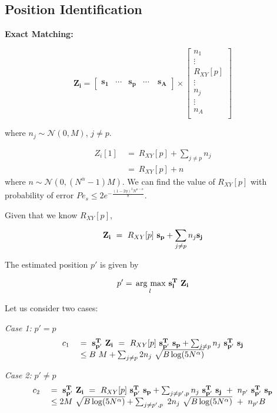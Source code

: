 \subsection{\bf Position Identification}
{\bf Exact Matching:}

\[
\mathbf{Z_i} = \begin{bmatrix}
\mathbf{s_1}       & \cdots   & \mathbf{s_p} &\cdots \ &\mathbf{s_A}
\end{bmatrix} \times
    \begin{bmatrix}
n_1 \\
\vdots \\
R_{XY}[p]\\
\vdots\\
n_j \\
\vdots\\
n_{A}\\
\end{bmatrix}
\]


where $n_j \sim \mathcal{N}(0,M)$, $j \neq p$.

\[\begin{array}{ll}
Z_i[1] \ &= \ R_{XY}[p] + \sum_{j \neq p}n_j \\
         &= \ R_{XY}[p] + n 
\end{array}
\]
where $n \sim \mathcal{N}(0,(N^\alpha-1)M)$. We can find the value of $R_{XY}[p]$ with probability of error $Pe_s \leq 2 e^{- \frac{(1-2\eta)^2N^{\mu-\alpha}}{8}}$.

Given that we know $R_{XY}[p]$, 

\[ \mathbf{Z_i} \ = \ R_{XY}[p] ~ \mathbf{s_p}+ \sum_{j \neq p}n_j \mathbf{s_j} \\
\]

The estimated position $p'$ is given by

\[ p' = \underset{l}{\operatorname*{\,arg\ max}}\ \bf s^T_l ~ Z_i\]

Let us consider two cases:

{\textit{Case 1:} $p' = p$}
 \[
 \begin{array}{ll}
 c_1 \ &= \ \mathbf{s^T_{p'}} ~\mathbf{Z_i} \ = \ R_{XY}[p] {\bf ~s^T_{p'}~ s_p}+ \sum_{j \neq p}n_j {\bf ~s^T_{p'}~ s_j}\\
       &\leq B ~ M +  \sum_{j \neq p} 2 n_j ~ \sqrt{B\log(5N^{\alpha})}  
 \end{array} 
  \]
  
{\textit{Case 2:} $p' \neq p$}
\[
\begin{array}{ll}
c_2 \ &= \ \mathbf{s^T_{p'}} ~\mathbf{Z_i}\ = \ R_{XY}[p]  {\bf ~s^T_{p'}~ s_p}+ \sum_{j \neq p',p}n_j{\bf ~s^T_{p'}~ s_j} \ + \ n_{p'} {\bf ~s^T_{p'}~ s_p} \\
&\leq 2M ~ \sqrt{B\log(5N^{\alpha})} + \sum_{j \neq p',p} \ 2n_j ~ \sqrt{B\log(5N^{\alpha})} \ + \ n_{p'} B
\end{array} 
\]

